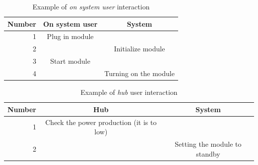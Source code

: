 \begin{table}[H]
	\begin{tabular}{| r | c | c |}
	\hline
		Number	& On system user	& System \\ \hline
		1		& Plug in module	& ~ \\ \hline
		2		& ~					& Initialize module \\ \hline
		3		& Start module		& ~ \\ \hline
		4		& ~					& Turning on the module \\ \hline
	\end{tabular}
	\caption{Example of \textit{on system user} interaction}
\end{table}

\begin{table}[H]
	\begin{tabular}{| r | c | c |}
	\hline
		Number	& Hub				& System \\ \hline
		1		& Check the power production (it is to low)	& ~ \\ \hline
		2		& ~											& Setting the module to standby \\ \hline
	\end{tabular}
	\caption{Example of \textit{hub} user interaction}
\end{table}	

